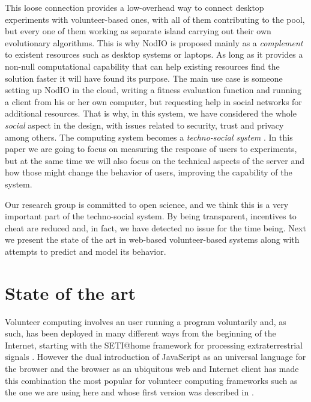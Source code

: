 \documentclass[letterpaper]{article}
\begin{document}
This loose connection provides a low-overhead way to connect desktop
experiments with volunteer-based ones, with all of them contributing
to the pool, but every one of them working as separate island 
carrying out their own evolutionary algorithms. This is why NodIO is
proposed mainly as a {\em complement} to existent resources such as
desktop systems or laptops. As long as it provides a non-null
computational capability that can help existing resources find the
solution faster it will have found its purpose. The main use case is
someone setting up NodIO in the cloud, writing a fitness evaluation
function and running a client from his or her own computer, but
requesting help in social networks for additional resources. That is
why, in this system,  we have considered the whole {\em social} aspect
in the design, with issues related to security, trust and privacy
among others. The computing system becomes a {\em techno-social
  system} \citep{vespignani2009predicting}. In this paper we are going
to focus on measuring the response of users to experiments, but at the
same time we will also focus on the technical aspects of the server and how
those might change the behavior of users, improving the capability of %
the system.

Our research group is committed to open science, and we think this is
a very important part of the techno-social system. By being
transparent, incentives to cheat are reduced and, in fact, we have
detected no issue for the time being. Next we present the state of the art in web-based
volunteer-based systems along with attempts to predict and model its
behavior. 


\section{State of the art}
\label{sec:soa}

Volunteer computing involves an user running a program voluntarily
and, as such, has been deployed in many different ways from the
beginning of the Internet, starting with the SETI@home framework for
processing extraterrestrial signals \citep{david-seti:home}. However
the dual introduction of JavaScript as an universal language for the
browser and the browser as an ubiquitous web and Internet client has
made this combination the most popular for volunteer computing
frameworks such as the one we are using here and whose first version
was described in \citep{DBLP:conf/gecco/GuervosG15}.
\end{document}

